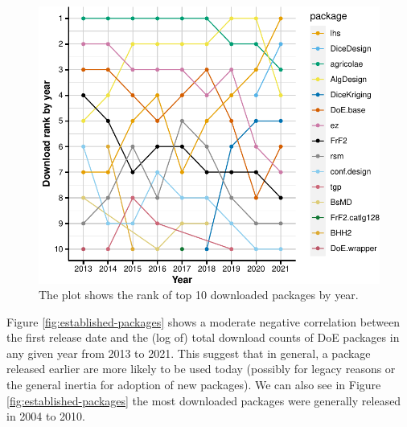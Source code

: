 \documentclass{article}
\begin{document}
\begin{figure}[htbp]

{\centering \includegraphics{figures/rank-over-time-1} 

}

\caption{The plot shows the rank of top 10 downloaded packages by year. }\label{fig:rank-over-time}
\end{figure}

Figure \ref{fig:established-packages} shows a moderate negative
correlation between the first release date and the (log of) total
download counts of DoE packages in any given year from 2013 to 2021.
This suggest that in general, a package released earlier are more likely
to be used today (possibly for legacy reasons or the general inertia for
adoption of new packages). We can also see in Figure
\ref{fig:established-packages} the most downloaded packages were
generally released in 2004 to 2010.
\end{document}
